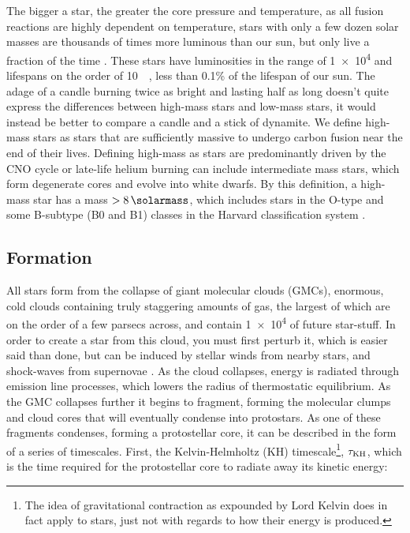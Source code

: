 The bigger a star, the greater the core pressure and temperature, as all fusion reactions are highly dependent on temperature, stars with only a few dozen solar masses are thousands of times more luminous than our sun, but only live a fraction of the time \parencite{carrollIntroductionModernAstrophysics2014}.
These stars have luminosities in the range of \SI{1e4}{\solarluminosity} and lifespans on the order of \SI{10}{\mega\year}, less than 0.1\% of the lifespan of our sun.
The adage of a candle burning twice as bright and lasting half as long doesn't quite express the differences between high-mass stars and low-mass stars, it would instead be better to compare a candle and a stick of dynamite.
We define high-mass stars as stars that are sufficiently massive to undergo carbon fusion near the end of their lives.
Defining high-mass as stars are predominantly driven by the CNO cycle or late-life helium burning can include intermediate mass stars, which form degenerate cores and evolve into white dwarfs.
By this definition, a high-mass star has a mass $>\SI{8}{\solarmass}$, which includes stars in the O-type and some B-subtype (B0 and B1) classes in the Harvard classification system
\parencite[143]{ward-thompsonIntroductionStarFormation2011}.


\subsection{Formation}
\label{sec:starformation}

All stars form from the collapse of giant molecular clouds (GMCs), enormous, cold clouds containing truly staggering amounts of gas, the largest of which are on the order of a few parsecs across, and contain \SI{1e4}{\solarmass} of future star-stuff.
In order to create a star from this cloud, you must first perturb it, which is easier said than done, but can be induced by stellar winds from nearby stars, and shock-waves from supernovae
\parencite[Ch.~3]{bodenheimerPrinciplesStarFormation2011}.
As the cloud collapses, energy is radiated through emission line processes, which lowers the radius of thermostatic equilibrium.
As the GMC collapses further it begins to fragment, forming the molecular clumps and cloud cores that will eventually condense into protostars.
As one of these fragments condenses, forming a protostellar core, it can be described in the form of a series of timescales.
First, the Kelvin-Helmholtz (KH) timescale\footnote{The idea of gravitational contraction as expounded by Lord Kelvin does in fact apply to stars, just not with regards to how their energy is produced.}, $\tau_\text{KH}$, which is the time required for the protostellar core to radiate away its kinetic energy:

